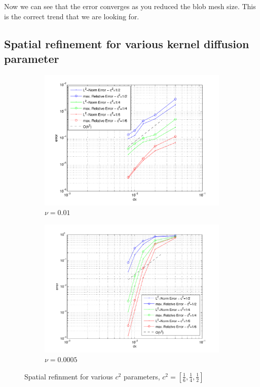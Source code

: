 Now we can see that the error converges as you reduced the blob mesh size. This is the correct trend that we are looking for.

\subsection{Spatial refinement for various kernel diffusion parameter}

\begin{figure}[!tbhp]
\centering
	\begin{subfigure}{0.48\textwidth}
		\centering
		\includegraphics[width=\textwidth]{./figures/wErrorVSdx_nu0p01_variousC2.pdf}	
		\caption{$\nu=0.01$}
	\end{subfigure}
	\begin{subfigure}{0.48\textwidth}
		\centering
		\includegraphics[width=\textwidth]{./figures/wErrorVSdx_nu0p0005_variousC2.pdf}	
		\caption{$\nu=0.0005$}
	\end{subfigure}
\caption{Spatial refinment for various $c^2$ parameters, $c^2 = [\frac{1}{6}, \frac{1}{4}, \frac{1}{2}]$}
\label{fig:wErrorVSdx_variousC2}
\end{figure}



